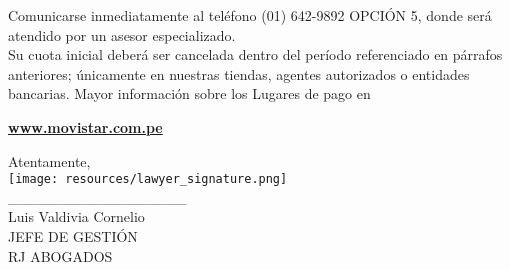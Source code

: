 \noindent Comunicarse inmediatamente al teléfono (01) 642-9892 OPCIÓN 5, donde será atendido por un asesor especializado.\\
\noindent Su cuota inicial deberá ser cancelada dentro del período referenciado en párrafos anteriores; únicamente en nuestras tiendas, agentes autorizados o entidades bancarias. Mayor información sobre los Lugares de pago en
\begin{center}
\underline{\textcolor[rgb]{0.00,0.07,1.00}{\textbf{www.movistar.com.pe}}}
\end{center}

\noindent Atentamente,\\
\texttt{[image: resources/lawyer\_signature.png]}\\
\_\_\_\_\_\_\_\_\_\_\_\_\_\_\_\_\_\\
{\small Luis Valdivia Cornelio\\
JEFE DE GESTIÓN\\
RJ ABOGADOS}\\


